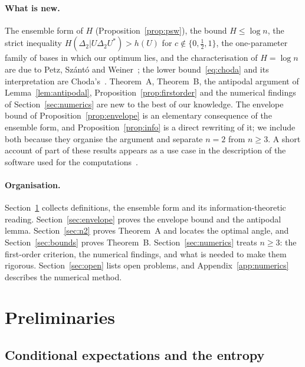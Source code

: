 \documentclass[11pt]{article}
\theoremstyle{plain}
\theoremstyle{definition}
\theoremstyle{remark}
\begin{document}
\paragraph{What is new.} The ensemble form of $H$ (Proposition~\ref{prop:psw}), the bound $H\le\log n$, the strict
inequality $H(\Delta_2|U\Delta_2U^*)>h(U)$ for $c\notin\{0,\frac12,1\}$, the one-parameter family of bases in which our
optimum lies, and the characterisation of $H=\log n$ are due to Petz, Sz\'ant\'o and Weiner~\cite{petz2009}; the lower
bound~\eqref{eq:choda} and its interpretation are Choda's~\cite{choda}. Theorem~A, Theorem~B, the antipodal argument of
Lemma~\ref{lem:antipodal}, Proposition~\ref{prop:firstorder} and the numerical findings of Section~\ref{sec:numerics} are
new to the best of our knowledge. The envelope bound of Proposition~\ref{prop:envelope} is an elementary consequence of the
ensemble form, and Proposition~\ref{prop:info} is a direct rewriting of it; we include both because they organise the
argument and separate $n=2$ from $n\ge3$. A short account of part of these results appears as a use case in the
description of the software used for the computations~\cite{lib}.

\paragraph{Organisation.} Section~\ref{sec:prelim} collects definitions, the ensemble form and its information-theoretic
reading. Section~\ref{sec:envelope} proves the envelope bound and the antipodal lemma. Section~\ref{sec:n2} proves
Theorem~A and locates the optimal angle, and Section~\ref{sec:bounds} proves Theorem~B. Section~\ref{sec:numerics} treats
$n\ge3$: the first-order criterion, the numerical findings, and what is needed to make them rigorous.
Section~\ref{sec:open} lists open problems, and Appendix~\ref{app:numerics} describes the numerical method.

\section{Preliminaries}\label{sec:prelim}

\subsection{Conditional expectations and the entropy}
\end{document}
